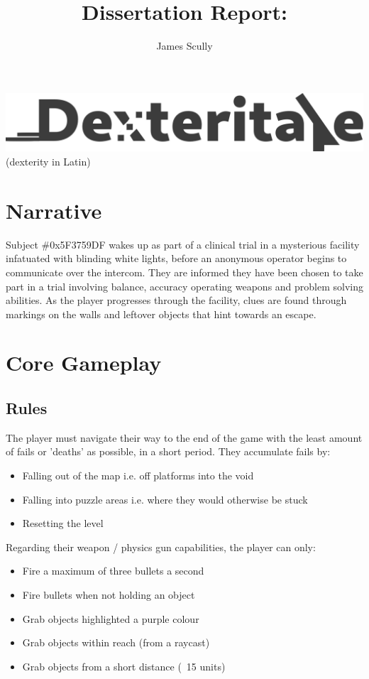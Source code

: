 \documentclass[11pt]{article}
\title{Dissertation Report: \pt}
\author{James Scully}
\begin{document}
\begin{center}
\includegraphics[width=0.75\linewidth]{logo}  \\
(dexterity in Latin)
\end{center}

\section{Narrative}
Subject \#0x5F3759DF wakes up as part of a clinical trial in a mysterious facility infatuated with blinding white lights, before an anonymous operator begins to communicate over the intercom. They are informed they have been chosen to take part in a trial involving balance, accuracy operating weapons and problem solving abilities. As the player progresses through the facility, clues are found through markings on the walls and leftover objects that hint towards an escape. 


\section{Core Gameplay}
\subsection{Rules}
The player must navigate their way to the end of the game with the least amount of fails or 'deaths' as possible, in a short period. They accumulate fails by: 

\begin{itemize}
	\item Falling out of the map i.e. off platforms into the void
	\item Falling into puzzle areas i.e. where they would otherwise be stuck
	\item Resetting the level \\
\end{itemize} 

Regarding their weapon / physics gun capabilities, the player can only:

\begin{itemize}
	\item Fire a maximum of three bullets a second
	\item Fire bullets when not holding an object
	\item Grab objects highlighted a purple colour
	\item Grab objects within reach (from a raycast)
	\item Grab objects from a short distance (~15 units) \\
	
\end{itemize}
\end{document}

